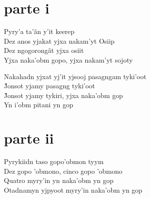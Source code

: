 
\medskip
\section{parte i}

  \noindent Pyry'a ta'ãn y'it keerep\\
  Dez anos yjakat yjxa nakam'yt Osiip\\
  Dez ngogorongãt yjxa osiit\\
  Yjxa naka'obm gopo, yjxa nakam'yt sojoty
 
 \smallskip
 \begin{center}\end{center}
 \smallskip
 
\noindent   Nakahadn yjxat yj'it yjsooj pasagngam tyki'oot\\
  J̃onsot yjamy pasagng tyki’oot\\
  J̃onsot yjamy tykiri, yjxa naka’obm gop\\
  Yn i’obm pitani yn gop
 
 
\medskip
\section{parte ii}

  \noindent Pyrykiidn taso gopo'obmon tyym\\
  Dez gopo 'obmono, cinco gopo 'obmono\\
  Quatro myry'in yn naka'obm yn gop\\
  Otadnamyn yjpyoot myry'in naka'obm yn gop
 
